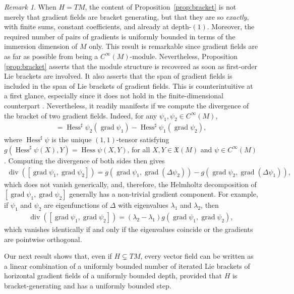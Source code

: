 \documentclass{article}
\theoremstyle{remark}
\newtheorem{remark}[theorem]{Remark}
\newcommand{\M}{M}
\newcommand{\Cinf}{C^{\infty}(\M)}
\newcommand{\X}{\mathfrak{X}(\M)}
\DeclareMathOperator{\grad}{\mathrm{grad}}
\DeclareMathOperator{\Div}{div}
\DeclareMathOperator{\Hess}{Hess}
\begin{document}
\begin{remark}
When $H=T\M$, the content of Proposition~\ref{prop:bracket} is not merely that gradient fields are bracket generating, but that they are so \emph{exactly}, with finite sums, constant coefficients, and already at depth-$(1)$. Moreover, the required number of pairs of gradients is uniformly bounded in terms of the immersion dimension of $\M$ only. This result is remarkable since gradient fields are as far as possible from being a $\Cinf$-module. Nevertheless, Proposition \ref{prop:bracket} asserts that the module structure is recovered as soon as first-order Lie brackets are involved. It also asserts that the span of gradient fields is included in the span of Lie brackets of gradient fields. This is counterintuitive at a first glance, especially since it does not hold in the finite-dimensional counterpart \cite{AbdelgalilGeorgiou2025}. Nevertheless, it readily manifests if we compute the divergence of the bracket of two gradient fields. Indeed, for any $\psi_1,\psi_2\in\Cinf$, 
%
\begin{align*}
[\grad \psi_1,\grad \psi_2] = \Hess^\sharp \psi_2 (\grad \psi_1) - \Hess^\sharp\psi_1( \grad \psi_2), 
\end{align*}
%
where $\Hess^\sharp\psi$ is the unique $(1,1)$-tensor satisfying $g(\Hess^\sharp\psi (X),Y) = \Hess\psi(X,Y)$, for all $X,Y\in\X$ and $\psi\in\Cinf$. Computing the divergence of both sides then gives
%
\begin{align*}
    \Div([\grad \psi_1,\grad \psi_2]) = g(\grad \psi_1,\grad (\Delta \psi_2)) - g(\grad \psi_2,\grad (\Delta \psi_1)),
\end{align*}
%
which does not vanish generically, and, therefore, the Helmholtz decomposition of $[\grad \psi_1,\grad \psi_2]$ generally has a non-trivial gradient component. For example, if $\psi_1$ and $\psi_2$ are eigenfunctions of $\Delta$ with eigenvalues $\lambda_1$ and $\lambda_2$, then
%
\begin{align*}
    \Div([\grad \psi_1,\grad \psi_2]) = (\lambda_2-\lambda_1)g(\grad\psi_1,\grad\psi_2),
\end{align*}
%
which vanishes identically if and only if the eigenvalues coincide or the gradients are pointwise orthogonal.
%
\end{remark}
%


Our next result shows that, even if $H\subsetneq T\M$, every vector field can be written as a linear combination of a uniformly bounded number of iterated Lie brackets of horizontal gradient fields of a uniformly bounded depth, provided that $H$ is bracket-generating and has a uniformly bounded step.
%
\end{document}
